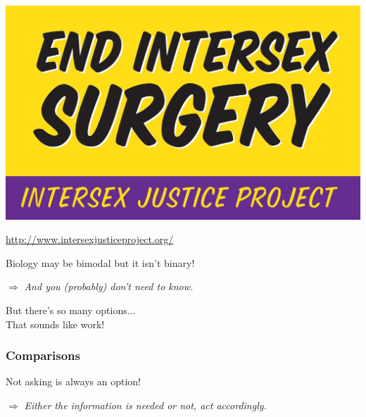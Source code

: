 \documentclass[aspectratio=169,x11names]{beamer}
\begin{document}
\begin{frame}
\begin{center}
\includegraphics[height=0.6\textheight,keepaspectratio]{images/end_intersex_surgeries.jpg} 
\bigskip

\large
\url{http://www.intersexjusticeproject.org/}
\end{center}
\end{frame}

\begin{frame}
\begin{center}
\huge
Biology may be bimodal but it isn't binary!\medskip

\Large
$\Rightarrow$ \emph{And you (probably) don't need to know.}
\end{center}
\end{frame}

\begin{frame}
\begin{center}
\huge
But there's so many options...\\
That sounds like work!
\end{center}
\end{frame}

\begin{frame}
\frametitle{Comparisons}
\end{frame}

\begin{frame}
\begin{center}
\huge
Not asking is always an option!
\medskip

\Large
$\Rightarrow$ \emph{Either the information is needed or not, act accordingly.}
\end{center}
\end{frame}
\end{document}
